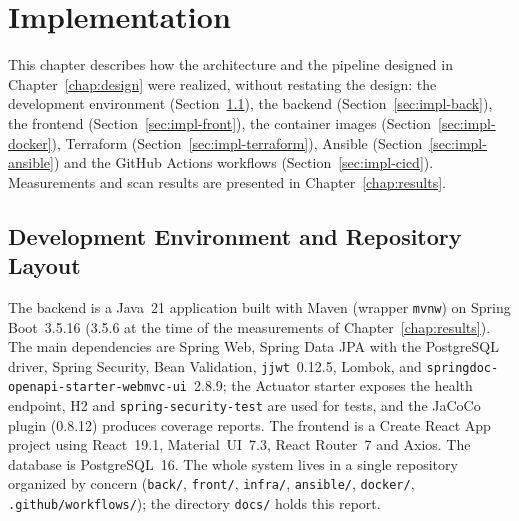 \chapter{Implementation}\label{chap:implementation}
\label{ch:implementation}

This chapter describes how the architecture and the pipeline designed in Chapter~\ref{chap:design} were realized, without restating the design: the development environment (Section~\ref{sec:impl-env}), the backend (Section~\ref{sec:impl-back}), the frontend (Section~\ref{sec:impl-front}), the container images (Section~\ref{sec:impl-docker}), Terraform (Section~\ref{sec:impl-terraform}), Ansible (Section~\ref{sec:impl-ansible}) and the GitHub Actions workflows (Section~\ref{sec:impl-cicd}). Measurements and scan results are presented in Chapter~\ref{chap:results}.

\section{Development Environment and Repository Layout}
\label{sec:impl-env}

The backend is a Java~21 application built with Maven (wrapper \texttt{mvnw}) on Spring Boot~3.5.16 (3.5.6 at the time of the measurements of Chapter~\ref{chap:results}). The main dependencies are Spring Web, Spring Data JPA with the PostgreSQL driver, Spring Security, Bean Validation, \texttt{jjwt}~0.12.5, Lombok, and \texttt{springdoc-openapi-starter-webmvc-ui}~2.8.9; the Actuator starter exposes the health endpoint, H2 and \texttt{spring-security-test} are used for tests, and the JaCoCo plugin (0.8.12) produces coverage reports. The frontend is a Create React App project using React~19.1, Material~UI~7.3, React Router~7 and Axios. The database is PostgreSQL~16. The whole system lives in a single repository organized by concern (\texttt{back/}, \texttt{front/}, \texttt{infra/}, \texttt{ansible/}, \texttt{docker/}, \texttt{.github/workflows/}); the directory \texttt{docs/} holds this report.

